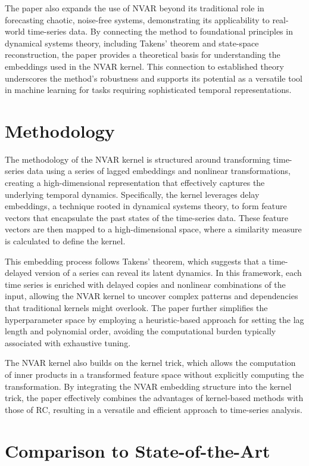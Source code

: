 The paper also expands the use of NVAR beyond its traditional role in forecasting chaotic, noise-free systems, demonstrating its applicability to real-world time-series data. By connecting the method to foundational principles in dynamical systems theory, including Takens' theorem and state-space reconstruction, the paper provides a theoretical basis for understanding the embeddings used in the NVAR kernel. This connection to established theory underscores the method's robustness and supports its potential as a versatile tool in machine learning for tasks requiring sophisticated temporal representations.

\section{Methodology}

The methodology of the NVAR kernel is structured around transforming time-series data using a series of lagged embeddings and nonlinear transformations, creating a high-dimensional representation that effectively captures the underlying temporal dynamics. Specifically, the kernel leverages delay embeddings, a technique rooted in dynamical systems theory, to form feature vectors that encapsulate the past states of the time-series data. These feature vectors are then mapped to a high-dimensional space, where a similarity measure is calculated to define the kernel.

This embedding process follows Takens' theorem, which suggests that a time-delayed version of a series can reveal its latent dynamics. In this framework, each time series is enriched with delayed copies and nonlinear combinations of the input, allowing the NVAR kernel to uncover complex patterns and dependencies that traditional kernels might overlook. The paper further simplifies the hyperparameter space by employing a heuristic-based approach for setting the lag length and polynomial order, avoiding the computational burden typically associated with exhaustive tuning.

The NVAR kernel also builds on the kernel trick, which allows the computation of inner products in a transformed feature space without explicitly computing the transformation. By integrating the NVAR embedding structure into the kernel trick, the paper effectively combines the advantages of kernel-based methods with those of RC, resulting in a versatile and efficient approach to time-series analysis.

\section{Comparison to State-of-the-Art}

